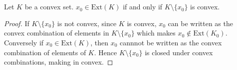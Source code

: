 
\chapter{}

\begin{lemma}
  Let $K$ be a convex set. $x_0 \in \textrm{Ext}(K)$ if and only if
  $K \setminus \{ x_0 \}$ is convex.
  \label{lem:extreme_point_of_convex_set}
\end{lemma}
\begin{proof}
  If $K \setminus \{ x_0 \}$ is not convex, since $K$ is convex,
  $x_0$ can be written as the convex combination of elements in
  $K\setminus \{ x_0 \}$
  which makes $x_0 \notin \textrm{Ext}(K_0)$. Conversely if $x_0 \in
  \textrm{Ext}(K)$, then
  $x_0$ cannnot be written as the convex combination of elements of
  $K$. Hence $K \setminus \{ x_0 \}$
  is closed under convex combinations, making in convex.
\end{proof}

